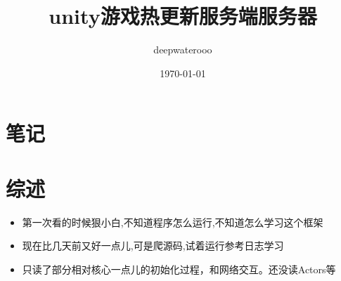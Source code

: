 \documentclass[9pt, b5paper]{article}
\author{deepwaterooo}
\date{\today}
\title{unity游戏热更新服务端服务器}
\begin{document}
\maketitle
\tableofcontents


\section{笔记}
\label{sec-1}
\section{综述}
\label{sec-2}
\begin{itemize}
\item 第一次看的时候狠小白,不知道程序怎么运行,不知道怎么学习这个框架
\item 现在比几天前又好一点儿,可是爬源码,试着运行参考日志学习
\item 只读了部分相对核心一点儿的初始化过程，和网络交互。还没读Actors等
\end{itemize}
\end{document}
